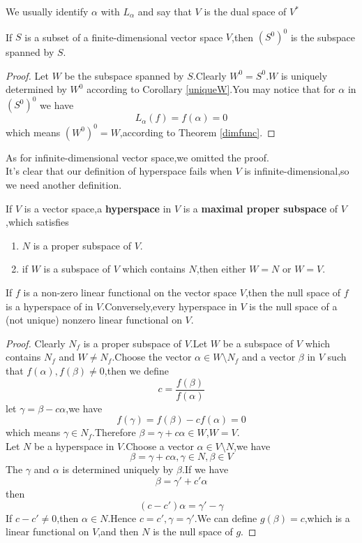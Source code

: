 \documentclass{article}
\begin{document}
We usually identify $\alpha$ with $L_\alpha$ and say that $V$ is the dual space of $V^*$
\begin{thm}
	If $S$ is a subset of a finite-dimensional vector space $V$,then $(S^0)^0$ is the subspace spanned by $S$.
\end{thm}
\begin{proof}
	Let $W$ be the subspace spanned by $S$.Clearly $W^0=S^0$.$W$ is uniquely determined by $W^0$ according to Corollary \ref{uniqueW}.You may notice that for $\alpha$ in $(S^0)^0$ we have
	\[L_\alpha(f)=f(\alpha)=0\]
	which means $(W^0)^0=W$,according to Theorem \ref{dimfunc}.
\end{proof}
As for infinite-dimensional vector space,we omitted the proof.\\
\indent It's clear that our definition of hyperspace fails when $V$ is infinite-dimensional,so we need another definition.
\begin{dde}
	If $V$ is a vector space,a \textbf{hyperspace} in $V$ is a \textbf{maximal proper subspace} of $V$,which satisfies
	\begin{enumerate}
		\item $N$ is a proper subspace of $V$.
		\item if $W$ is a subspace of $V$ which contains $N$,then either $W=N$ or $W=V$.
	\end{enumerate}
\end{dde}
\begin{thm}
	If $f$ is a non-zero linear functional on the vector space $V$,then the null space of $f$ is a hyperspace of in $V$.Conversely,every hyperspace in $V$ is the null space of a (not unique) nonzero linear functional on $V$.
\end{thm}
\begin{proof}
	Clearly $N_f$ is a proper subspace of $V$.Let $W$ be a subspace of $V$ which contains $N_f$ and $W\neq N_f$.Choose the vector $\alpha\in W\setminus N_f$ and a vector $\beta$ in $V$ such that $f(\alpha),f(\beta)\neq0$,then we define
	\[c=\frac{f(\beta)}{f(\alpha)}\]
	let $\gamma=\beta-c\alpha$,we have
	\[f(\gamma)=f(\beta)-cf(\alpha)=0\]
	which means $\gamma\in N_f$.Therefore $\beta=\gamma+c\alpha\in W$,$W=V$.\\
	Let $N$ be a hyperspace in $V$.Choose a vector $\alpha\in V\setminus N$,we have
	\[\beta=\gamma+c\alpha,\gamma\in N,\beta\in V\]
	The $\gamma$ and $\alpha$ is determined uniquely by $\beta$.If we have
	\[\beta=\gamma'+c'\alpha\]
	then
	\[(c-c')\alpha=\gamma'-\gamma\]
	If $c-c'\neq0$,then $\alpha\in N$.Hence $c=c',\gamma=\gamma'$.We can define $g(\beta)=c$,which is a linear functional on $V$,and then $N$ is the null space of $g$. 
\end{proof}
\end{document}
